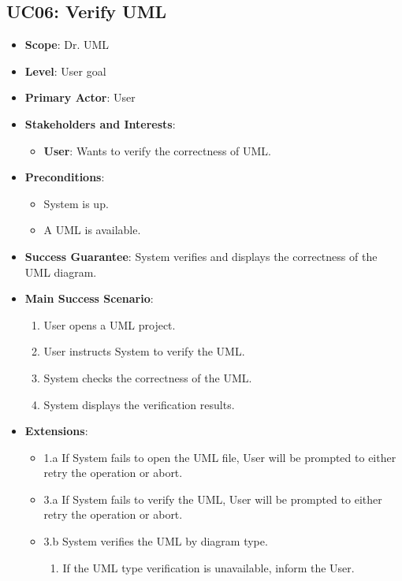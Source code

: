 \documentclass[12pt]{article}
\begin{document}
\subsection{UC06: Verify UML}
\begin{itemize}
    \item \textbf{Scope}: Dr. UML
    \item \textbf{Level}: User goal
    \item \textbf{Primary Actor}: User
    \item \textbf{Stakeholders and Interests}:
    \begin{itemize}
        \item \textbf{User}: Wants to verify the correctness of UML.
    \end{itemize}
    \item \textbf{Preconditions}:
    \begin{itemize}
        \item System is up.
        \item A UML is available.
    \end{itemize}
    \item \textbf{Success Guarantee}: System verifies and displays the correctness of the UML diagram.
    \item \textbf{Main Success Scenario}:
    \begin{enumerate}
        \item User opens a UML project.
        \item User instructs System to verify the UML.
        \item System checks the correctness of the UML.
        \item System displays the verification results.
    \end{enumerate}
    \item \textbf{Extensions}:
    \begin{itemize}
        \item 1.a If System fails to open the UML file, User will be prompted to either retry the operation or abort.
        \item 3.a If System fails to verify the UML, User will be prompted to either retry the operation or abort.
        \item 3.b System verifies the UML by diagram type.
        \begin{enumerate}
            \item If the UML type verification is unavailable, inform the User.
        \end{enumerate}

\end{itemize}
\end{itemize}
\end{document}
